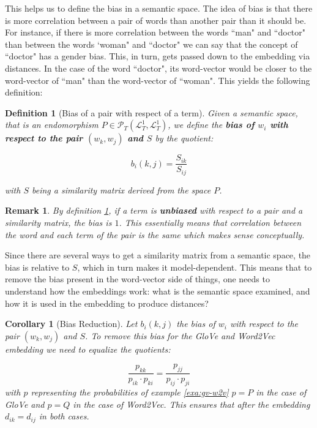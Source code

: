 \documentclass[10pt,a4paper]{elsarticle}
\renewcommand{\L}{\mathcal{L}}
\renewcommand{\P}{\mathcal{P}}
\newtheorem{cor}[theorem]{Corollary}
\newtheorem{definition}[theorem]{Definition}
\newtheorem{re}[theorem]{Remark}
\begin{document}
This helps us to define the bias in a semantic space. The idea of bias is that there is more correlation between a pair of words than another pair than it should be. For instance, if there is more correlation between the words ``man" and ``doctor" than between the words `woman" and ``doctor" we can say that the concept of ``doctor" has a gender bias. This, in turn, gets passed down to the embedding via distances. In the case of the word ``doctor", its word-vector would be closer to the word-vector of ``man" than the word-vector of ``woman". This yields the following definition:


\begin{definition}[Bias of a pair with respect of a term]\label{def:bias}
	Given a semantic space, that is an endomorphism $P\in \P_{T}(\L_{T}^{1},\L_{T}^{1})$, we define the \textbf{bias of $w_{i}$ with respect to the pair $(w_{k},w_{j})$ and $S$} by the quotient:
	
	\begin{equation}
		b_{i}(k,j)=\frac{S_{ik}}{S_{ij}}
	\end{equation}
	
	with $S$ being a similarity matrix derived from the space $P$.
\end{definition}

\begin{re}
	By definition \ref{def:bias}, if a term is \textbf{unbiased} with respect to a pair and a similarity matrix, the bias is $1$. This essentially means that correlation between the word and each term of the pair is the same which makes sense conceptually.
\end{re}

Since there are several ways to get a similarity matrix from a semantic space, the bias is relative to $S$, which in turn makes it model-dependent. This means that to remove the bias present in the word-vector side of things, one needs to understand how the embeddings work: what is the semantic space examined, and how it is used in the embedding to produce distances?


\begin{cor}[Bias Reduction]\label{cor:biasred}
	Let  $b_{i}(k,j)$ the bias of $w_{i}$ with respect to the pair $(w_{k},w_{j})$ and $S$. To remove this bias for the GloVe and Word2Vec embedding we need to equalize the quotients:
	
	
	\begin{equation}\label{eq:unbias}
		\frac{p_{kk}}{p_{ik}\cdot p_{ki}} = \frac{p_{jj}}{p_{ij}\cdot p_{ji}}
	\end{equation}
	with $p$ representing the probabilities of example \ref{exa:gv-w2v} $p=P$ in the case of GloVe and $p=Q$ in the case of Word2Vec. This ensures that after the embedding $d_{ik}=d_{ij}$ in both cases.
	
\end{cor}
\end{document}
